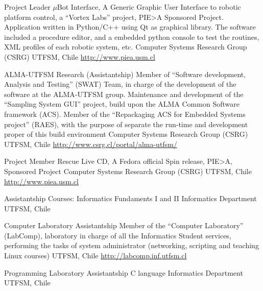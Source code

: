 \documentclass[12pt,a4paper]{moderncv}
\newcommand{\gray}{\textcolor{gray}}
\newcommand{\myurl}[1]{\gray{\url{#1}}}
\begin{document}
        {Project Leader}
        {$\mu$Bot Interface, A Generic Graphic User Interface to robotic platform
        control, a ``Vortex Labs'' project, PIE>A Sponsored Project.
        Application written in Python/C++ using Qt as graphical library.
        The software included a procedure editor, and a embedded python console
        to test the routines, XML profiles of each robotic system, etc.}
        {Computer Systems Research Group (CSRG)}
        {UTFSM, Chile}
        {\myurl{http://www.piea.usm.cl}}

        {ALMA-UTFSM Research (Assistantship)}
        {Member of ``Software development, Analysis and Testing'' (SWAT) Team,
        in charge of the development of the software at the ALMA-UTFSM group.
        Maintenance and development of the ``Sampling System GUI'' project,
        build upon the ALMA Common Software framework (ACS).
        Member of the ``Repackaging ACS for Embedded Systems project'' (RAES),
        with the purpose of separate the run-time and development
        proper of this build environment}
        {Computer Systems Research Group (CSRG)}
        {UTFSM, Chile}
        {\myurl{http://www.csrg.cl/portal/alma-utfsm/}}

        {Project Member}
        {Rescue Live CD, A Fedora official Spin release,
         PIE>A, Sponsored Project}
        {Computer Systems Research Group (CSRG)}
        {UTFSM, Chile}
        {\myurl{http://www.piea.usm.cl}}

        {Assistantship}
        {Courses: Informatics Fundaments  I and II}
        {Informatics Department}
        {UTFSM, Chile}
        {}

        {Computer Laboratory Assistantship}
        {Member of the ``Computer Laboratory'' (LabComp),
         laboratory in charge of all the Informatics Student services,
         performing the tasks of system administrator (networking, scripting and
         teaching Linux courses)}
        {UTFSM, Chile}
        {\myurl{http://labcomp.inf.utfsm.cl}}{}

        {Programming Laboratory Assistantship}
        {C language}
        {Informatics Department}
        {UTFSM, Chile}
        {}
\end{document}
